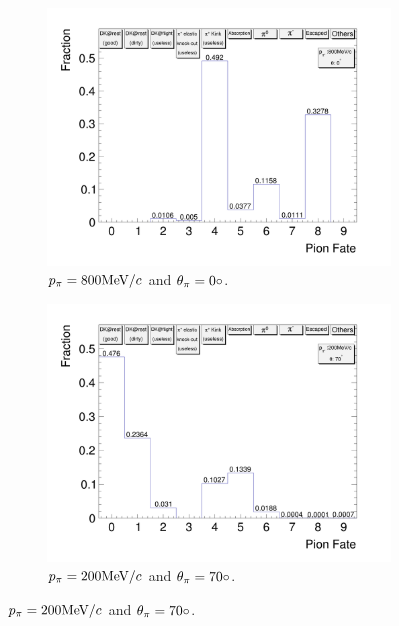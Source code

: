 \begin{figure}[t]
\begin{subfigure}{\dbfigwid\textwidth}
               \end{subfigure}
               \\
               \begin{subfigure}{\dbfigwid\textwidth}
                    \includegraphics[width=\textwidth]{figures/sel/pion_fate_800_0.png}
                    \caption{$p_{\pi}=800\textrm{MeV}/c$ and $\theta_{\pi}=0\circ$.}
                    \label{subfig:pi-fate-800-0}
               \end{subfigure}
               \begin{subfigure}{\dbfigwid\textwidth}
                    \includegraphics[width=\textwidth]{figures/sel/pion_fate_200_70.png}
                    \caption{$p_{\pi}=200\textrm{MeV}/c$ and $\theta_{\pi}=70\circ$.}

\end{subfigure}
\end{figure}
